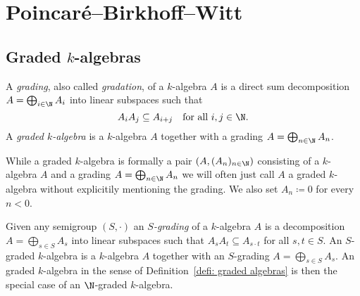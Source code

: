 




\section{Poincar\'{e}--Birkhoff--Witt}



\subsection{Graded $k$-algebras}


\begin{definition}\label{defi: graded algebras}
 A \emph{grading}, also called \emph{gradation}, of a $k$-algebra $A$ is a direct sum decomposition $A = \bigoplus_{i \in \N} A_i$ into linear subspaces such that
 \[
  A_i A_j \subseteq A_{i+j} \quad \text{for all $i,j \in \N$}.
 \]
 A \emph{graded $k$-algebra} is a $k$-algebra $A$ together with a grading $A = \bigoplus_{n \in \N} A_n$.
\end{definition}


\begin{remark}
 While a graded $k$-algebra is formally a pair $(A, (A_n)_{n \in \N})$ consisting of a $k$-algebra $A$ and a grading $A = \bigoplus_{n \in \N} A_n$ we will often just call $A$ a graded $k$-algebra without explicitily mentioning the grading. We also set $A_n \coloneqq 0$ for every $n < 0$.
\end{remark}


\begin{remark}
 Given any semigroup $(S,\cdot)$ an \emph{$S$-grading} of a $k$-algebra $A$ is a decomposition $A = \bigoplus_{s \in S} A_s$ into linear subspaces such that $A_s A_t \subseteq A_{s \cdot t}$ for all $s,t \in S$. An $S$-graded $k$-algebra is a $k$-algebra $A$ together with an $S$-grading $A = \bigoplus_{s \in S} A_s$. An graded $k$-algebra in the sense of Definition~\ref{defi: graded algebras} is then the special case of an $\N$-graded $k$-algebra.
\end{remark}


